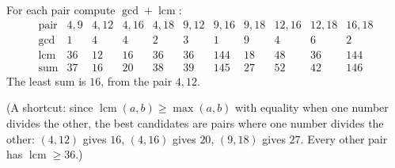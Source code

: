 For each pair compute $\gcd+\operatorname{lcm}$:
\[
\begin{array}{c|cccccccccc}
\text{pair}&4,9&4,12&4,16&4,18&9,12&9,16&9,18&12,16&12,18&16,18\\\hline
\gcd&1&4&4&2&3&1&9&4&6&2\\
\operatorname{lcm}&36&12&16&36&36&144&18&48&36&144\\
\text{sum}&37&16&20&38&39&145&27&52&42&146
\end{array}
\]
The least sum is $\boxed{16}$, from the pair $4,12$.

(A shortcut: since $\operatorname{lcm}(a,b)\ge\max(a,b)$ with equality when one number divides the other, the best candidates are pairs where one number divides the other: $(4,12)$ gives $16$, $(4,16)$ gives $20$, $(9,18)$ gives $27$. Every other pair has $\operatorname{lcm}\ge36$.)
